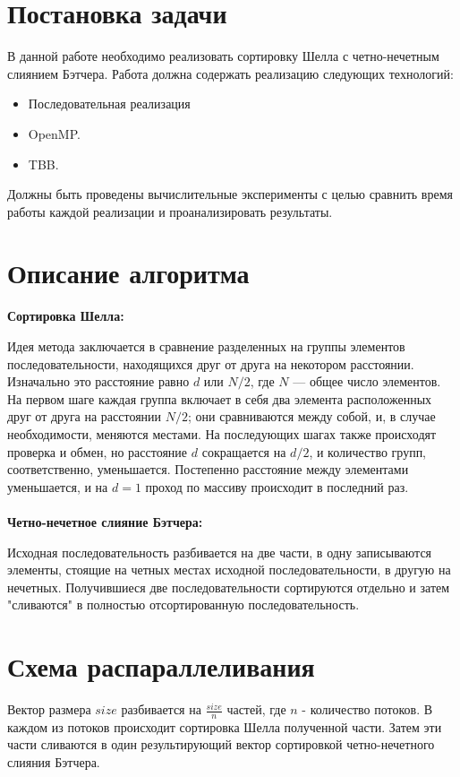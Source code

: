 \documentclass{report}
\begin{document}
\newpage
\section*{Постановка задачи}
\par В данной работе необходимо реализовать сортировку Шелла с четно-нечетным слиянием Бэтчера.
Работа должна содержать реализацию следующих технологий:
\begin{itemize}
\item Последовательная реализация
\item OpenMP.
\item TBB.
\end{itemize}
\par Должны быть проведены вычислительные эксперименты с целью сравнить время работы каждой реализации и проанализировать результаты.

\newpage

\section*{Описание алгоритма}
\textbf{Сортировка Шелла:}
\par Идея метода заключается в сравнение разделенных на группы элементов последовательности, находящихся друг от друга на некотором расстоянии. Изначально это расстояние равно $d$ или $N/2$, где $N$ — общее число элементов. На первом шаге каждая группа включает в себя два элемента расположенных друг от друга на расстоянии $N/2$; они сравниваются между собой, и, в случае необходимости, меняются местами. На последующих шагах также происходят проверка и обмен, но расстояние $d$ сокращается на $d/2$, и количество групп, соответственно, уменьшается. Постепенно расстояние между элементами уменьшается, и на $d=1$ проход по массиву происходит в последний раз.\\
\\
\textbf{Четно-нечетное слияние Бэтчера:}
\par Исходная последовательность разбивается на две части, в одну записываются элементы, стоящие на четных местах исходной последовательности, в другую на нечетных. Получившиеся две последовательности сортируются отдельно и затем "сливаются" в полностью отсортированную последовательность.
\newpage

\section*{Схема распараллеливания}
\par Вектор размера $size$ разбивается на  $\frac{size}{n}$ частей, где $n$ - количество потоков. 
В каждом из потоков происходит сортировка Шелла полученной части. Затем эти части сливаются в один результирующий вектор сортировкой четно-нечетного слияния Бэтчера.
\newpage
\end{document}
